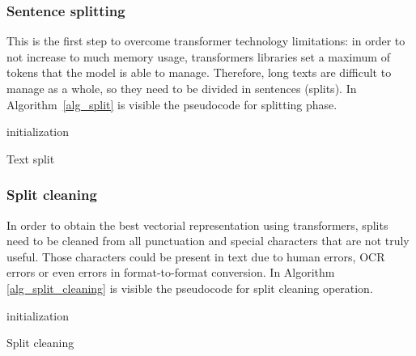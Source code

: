 \documentclass[\main/main.tex]{subfiles}
\begin{document}
\subsubsection{Sentence splitting}
This is the first step to overcome transformer technology limitations: in order to not increase to much memory usage, transformers libraries set a maximum of tokens that the model is able to manage. Therefore, long texts are difficult to manage as a whole, so they need to be divided in sentences (splits). In \mbox{Algorithm \ref{alg_split}} is visible the pseudocode for splitting phase.
\begin{center}
    \begin{algorithm}[H]
     initialization \\
     \caption{Text split}
     \label{alg_split}
    \end{algorithm}
\end{center}
\subsubsection{Split cleaning}
In order to obtain the best vectorial representation using transformers, splits need to be cleaned from all punctuation and special characters that are not truly useful. Those characters could be present in text due to human errors, OCR errors or even errors in format-to-format conversion. In Algorithm \ref{alg_split_cleaning} is visible the pseudocode for split cleaning operation.
\begin{center}
    \begin{algorithm}[H]
     initialization \\
     \caption{Split cleaning}
     \label{alg_split_cleaning}
    \end{algorithm}
\end{center}
\end{document}
